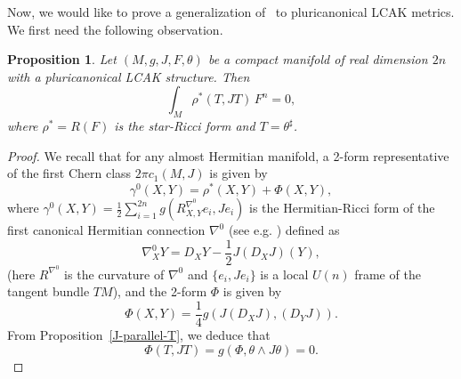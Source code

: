 \documentclass[a4paper,11pt]{amsart}
\newtheorem{prop}[thm]{Proposition}
\theoremstyle{definition}
\renewcommand{\[}{\begin{equation*}}
\renewcommand{\]}{\end{equation*}}
\begin{document}
Now, we would like to prove a generalization of~\cite{MR4771164,MR3674175} to pluricanonical LCAK metrics. We first need the following observation.
 \begin{prop}\label{star-ricci-contracted}
Let $(M, g, J, F, \theta)$ be a compact manifold of real dimension $2n$ with a pluricanonical LCAK structure. Then $$\int_M \rho^\ast(T,JT)\,F^n=0,$$ where $\rho^\ast=R(F)$ is the star-Ricci form and $T=\theta^\sharp$.
 \end{prop}
 \begin{proof}
We recall that for any almost Hermitian manifold, a 2-form representative of the first Chern class $2\pi c_1(M,J)$ is given by
\begin{equation} \label{Chernform} 
\gamma^0(X, Y) = \rho^*(X, Y) + \Phi(X, Y), 
\end{equation}
where $\gamma^0(X,Y)=\frac{1}{2}\sum\limits_{i=1}^{2n}g(R^{\nabla^0}_{X,Y}e_i,Je_i)$ is the Hermitian-Ricci form of the first canonical Hermitian connection $\nabla^0$ (see e.g. \cite{MR1456265}) defined as
$$\nabla^0_X Y = D_X Y - \frac{1}{2}J(D_X J)(Y),$$ 
(here $R^{\nabla^0}$ is the curvature of $\nabla^0$ and $\{e_i,Je_i\}$ is a local $U(n)$ frame of the tangent bundle $TM$), and the 2-form $\Phi$ is given by
\begin{equation*} \label{Phi} 
\Phi(X,Y) = \frac{1}{4} g( J\left(D_X J\right), \left(D_Y J\right)).
\end{equation*}
From Proposition~\ref{J-parallel-T}, we deduce that
\begin{equation}\label{vanishing-phi}
\Phi(T,JT) =g(\Phi,\theta\wedge J\theta)=0.

\end{equation}
\end{proof}
\end{document}
